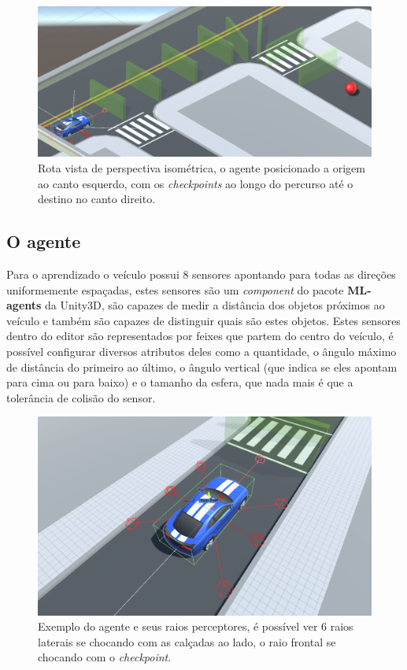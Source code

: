 \begin{figure}[h]
   \centering
   \includegraphics[scale=0.35]{figs/detalhe-rota.png}
    \caption{Rota vista de perspectiva isométrica, o agente posicionado a origem ao canto esquerdo, com os \textit{checkpoints} ao longo do percurso até o destino no canto direito.}
    \label{fig:route-view}
 \end{figure}

 \subsection{O agente}\label{agent-subsection}
 Para o aprendizado o veículo possui 8 sensores apontando para todas as direções uniformemente espaçadas, estes sensores são um \textit{component} do pacote \textbf{ML-agents} da Unity3D, são capazes de medir a distância dos objetos próximos ao veículo e também são capazes de distinguir quais são estes objetos. Estes sensores dentro do editor são representados por feixes que partem do centro do veículo, é possível configurar diversos atributos deles como a quantidade, o ângulo máximo de distância do primeiro ao último, o ângulo vertical (que indica se eles apontam para cima ou para baixo) e o tamanho da esfera, que nada mais é que a tolerância de colisão do sensor.

 \begin{figure}[h]
   \centering
   \includegraphics[scale=0.35]{figs/agente-raios-checkpoint.png}
    \caption{Exemplo do agente e seus raios perceptores, é possível ver 6 raios laterais se chocando com as calçadas ao lado, o raio frontal se chocando com o \textit{checkpoint}.}
    \label{fig:casting-rays}
 \end{figure}

